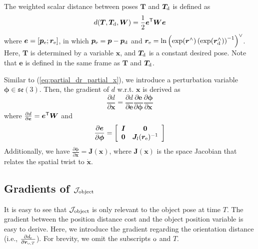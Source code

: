 {The weighted scalar distance between poses $\bm T$ and $\bm T_{\rm d}$ is defined as  
\begin{equation} 
\begin{aligned}
    d(\bm T, \bm T_{\rm d}, \bm W) = \frac{1}{2} \bm e^{\mathsf{T}} \bm W \bm e
\end{aligned}
\end{equation}
where $\bm e = [\bm p_{\rm e}; \bm r_{\rm e}]$, in which  
$\bm p_{\rm e} = \bm p - \bm p_{\rm d}$ and 
$\bm r_{\rm e} = \ln \left( \exp(\bm r^{\wedge}) \left(\exp (\bm r_{\rm d}^{\wedge}) \right)^{-1} \right)^{\vee}$.
Here, $\bm T$ is determined by a variable $\bm x$, and $\bm T_{\rm d}$ is a constant desired pose.
Note that $\bm e$ is defined in the same frame as $\bm T$ and $\bm T_{\rm d}$.

Similar to (\ref{eq:partial_dr_partial_x}), we introduce a perturbation variable $\bm \phi \in \mathfrak{se}(3)$. 
Then, the gradient of $d$ w.r.t. $\bm x$ is derived as
\begin{equation} \label{eq:partial_d_partial_x}
    \frac{\partial d}{\partial \bm x} 
    = \frac{\partial d}{\partial \bm e}
    \frac{\partial \bm e}{\partial \bm \phi} 
    \frac{\partial \bm \phi}{\partial \bm x} 
\end{equation}
where 
$\frac{\partial d}{\partial \bm e} = \bm e^{\mathsf{T}} \bm W$
and
\begin{equation}
    \frac{\partial \bm e}{\partial \bm \phi} = 
    \left[
    \begin{array}{cc}
    \bm I & \bm 0 \\
    \bm 0 & \bm J_l(\bm r_{\rm e})^{-1}
    \end{array}
    \right]
\end{equation}
Additionally, we have $\frac{\partial \bm \phi}{\partial \bm x} = \bm J(\bm x)$, where $\bm J(\bm x)$ is the space Jacobian that relates the spatial twist to $\dot{\bm x}$.



\subsection{Gradients of $\mathcal{J}_{\rm object}$}

It is easy to see that $\mathcal{J}_{\rm object}$ is only relevant to the object pose at time $T$. The gradient between the position distance cost and the object position variable is easy to derive. Here, we introduce the gradient regarding the orientation distance (i.e., $\frac{\partial d_{\rm r}}{\partial \bm r_{\text{o}, T}}$). 
For brevity, we omit the subscripts $\rm o$ and $T$.

}
